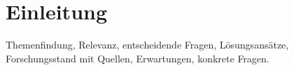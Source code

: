  

\chapter[Einleitung]{Einleitung}

Themenfindung, Relevanz, entscheidende Fragen, Lösungsansätze, Forschungsstand mit Quellen\cite{zeitbomben}, Erwartungen, konkrete Fragen.




